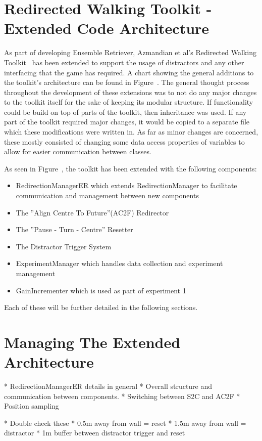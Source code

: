 \section{Redirected Walking Toolkit - Extended Code Architecture}
As part of developing Ensemble Retriever, Azmandian et al's Redirected Walking Toolkit~\cite{azmandian2016redirected} has been extended to support the usage of distractors and any other interfacing that the game has required. A chart showing the general additions to the toolkit's architecture can be found in Figure~. The general thought process throughout the development of these extensions was to not do any major changes to the toolkit itself for the sake of keeping its modular structure. If functionality could be build on top of parts of the toolkit, then inheritance was used. If any part of the toolkit required major changes, it would be copied to a separate file which these modifications were written in. As far as minor changes are concerned, these mostly consisted of changing some data access properties of variables to allow for easier communication between classes.

As seen in Figure~, the toolkit has been extended with the following components:
\begin{itemize}
    \item RedirectionManagerER which extends RedirectionManager to facilitate communication and management between new components
    \item The ''Align Centre To Future''(AC2F) Redirector
    \item The ''Pause - Turn - Centre'' Resetter
    \item The Distractor Trigger System
    \item ExperimentManager which handles data collection and experiment management
    \item GainIncrementer which is used as part of experiment 1
\end{itemize}

Each of these will be further detailed in the following sections. 

\section{Managing The Extended Architecture}
* RedirectionManagerER details in general
* Overall structure and communication between components.
* Switching between S2C and AC2F
* Position sampling

* Double check these
* 0.5m away from wall = reset
* 1.5m away from wall = distractor
* 1m buffer between distractor trigger and reset


